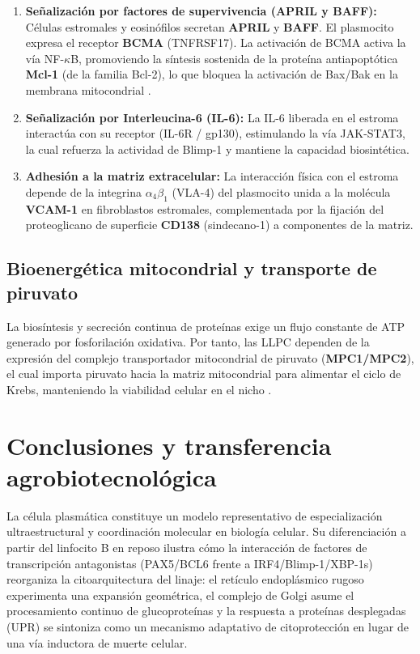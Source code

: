 \begin{enumerate}
	\item \textbf{Señalización por factores de supervivencia (APRIL y BAFF):} Células estromales y eosinófilos secretan \textbf{APRIL} y \textbf{BAFF}. El plasmocito expresa el receptor \textbf{BCMA} (TNFRSF17). La activación de BCMA activa la vía NF-$\kappa$B, promoviendo la síntesis sostenida de la proteína antiapoptótica \textbf{Mcl-1} (de la familia Bcl-2), lo que bloquea la activación de Bax/Bak en la membrana mitocondrial \parencite{tellier2019plasma}.
	\item \textbf{Señalización por Interleucina-6 (IL-6):} La IL-6 liberada en el estroma interactúa con su receptor (IL-6R / gp130), estimulando la vía JAK-STAT3, la cual refuerza la actividad de Blimp-1 y mantiene la capacidad biosintética.
	\item \textbf{Adhesión a la matriz extracelular:} La interacción física con el estroma depende de la integrina $\alpha_4\beta_1$ (VLA-4) del plasmocito unida a la molécula \textbf{VCAM-1} en fibroblastos estromales, complementada por la fijación del proteoglicano de superficie \textbf{CD138} (sindecano-1) a componentes de la matriz.
\end{enumerate}

\subsection{Bioenergética mitocondrial y transporte de piruvato}
La biosíntesis y secreción continua de proteínas exige un flujo constante de ATP generado por fosforilación oxidativa. Por tanto, las LLPC dependen de la expresión del complejo transportador mitocondrial de piruvato (\textbf{MPC1/MPC2}), el cual importa piruvato hacia la matriz mitocondrial para alimentar el ciclo de Krebs, manteniendo la viabilidad celular en el nicho \parencite{lam2018metabolic}.

\section{Conclusiones y transferencia agrobiotecnológica}

La célula plasmática constituye un modelo representativo de especialización ultraestructural y coordinación molecular en biología celular. Su diferenciación a partir del linfocito B en reposo ilustra cómo la interacción de factores de transcripción antagonistas (PAX5/BCL6 frente a IRF4/Blimp-1/XBP-1s) reorganiza la citoarquitectura del linaje: el retículo endoplásmico rugoso experimenta una expansión geométrica, el complejo de Golgi asume el procesamiento continuo de glucoproteínas y la respuesta a proteínas desplegadas (UPR) se sintoniza como un mecanismo adaptativo de citoprotección en lugar de una vía inductora de muerte celular.

